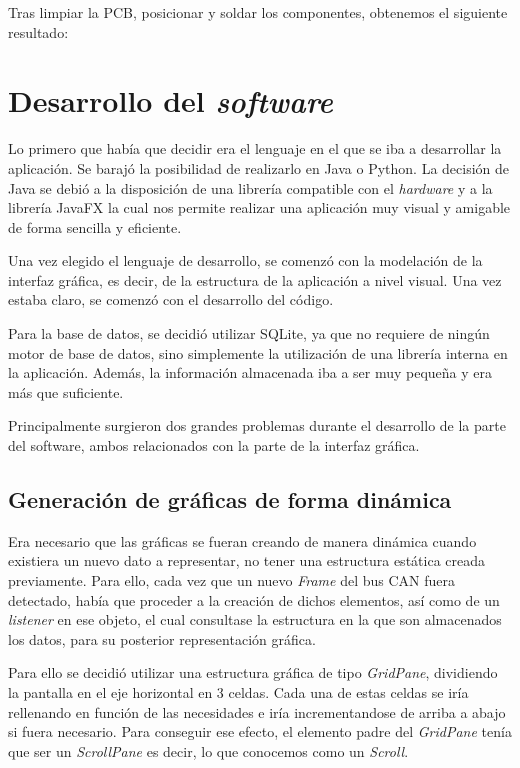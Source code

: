 

Tras limpiar la PCB, posicionar y soldar los componentes, obtenemos el siguiente resultado:



\section{Desarrollo del \emph{software}}

Lo primero que había que decidir era el lenguaje en el que se iba a desarrollar la aplicación. Se barajó la posibilidad de realizarlo en Java o Python. La decisión de Java se debió a la disposición de una librería compatible con el \emph{hardware} y a la librería JavaFX la cual nos permite realizar una aplicación muy visual y amigable de forma sencilla y eficiente.

Una vez elegido el lenguaje de desarrollo, se comenzó con la modelación de la interfaz gráfica, es decir, de la estructura de la aplicación a nivel visual. Una vez estaba claro, se comenzó con el desarrollo del código.

Para la base de datos, se decidió utilizar SQLite, ya que no requiere de ningún motor de base de datos, sino simplemente la utilización de una librería interna en la aplicación. Además, la información almacenada iba a ser muy pequeña y era más que suficiente.

Principalmente surgieron dos grandes problemas durante el desarrollo de la parte del software, ambos relacionados con la parte de la interfaz gráfica.

\subsection{Generación de gráficas de forma dinámica}\label{generacion_de_graficas_de_forma_dinamica}

Era necesario que las gráficas se fueran creando de manera dinámica cuando existiera un nuevo dato a representar, no tener una estructura estática creada previamente. Para ello, cada vez que un nuevo \emph{Frame} del bus CAN fuera detectado, había que proceder a la creación de dichos elementos, así como de un \emph{listener} en ese objeto, el cual consultase la estructura en la que son almacenados los datos, para su posterior representación gráfica.

Para ello se decidió utilizar una estructura gráfica de tipo \emph{GridPane}, dividiendo la pantalla en el eje horizontal en 3 celdas. Cada una de estas celdas se iría rellenando en función de las necesidades e iría incrementandose de arriba a abajo si fuera necesario. Para conseguir ese efecto, el elemento padre del \emph{GridPane} tenía que ser un \emph{ScrollPane} es decir, lo que conocemos como un \emph{Scroll}.

